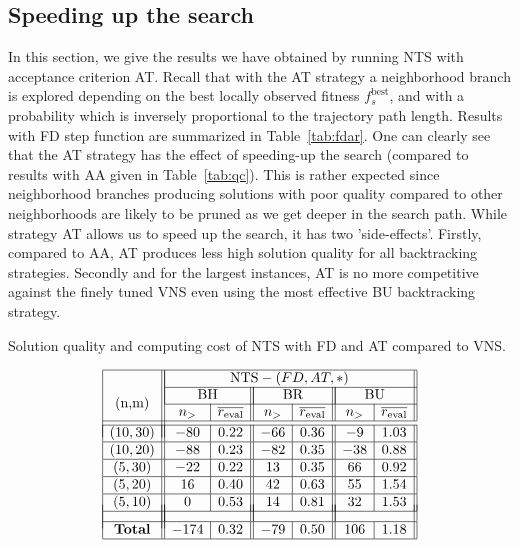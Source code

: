 \documentclass{acm_proc_article-sp}
\begin{document}
\subsection{Speeding up the search}
In this section, we give the results we have obtained by running NTS with acceptance criterion AT. Recall that with the AT strategy a neighborhood branch is explored depending on the best locally observed fitness $f_s^{\textrm{best}}$,  and with a probability which is inversely proportional to the trajectory path length. Results with FD step function are summarized in Table~\ref{tab:fdar}. One can clearly see that the AT strategy has the effect of speeding-up the search (compared to results with AA given in Table~\ref{tab:qc}). This is rather expected since neighborhood branches producing solutions with poor quality compared to other neighborhoods are likely to be pruned as we get deeper in the search path. While strategy AT allows us to speed up the search, it has two 'side-effects'. Firstly, compared to AA, AT produces less high solution quality for all backtracking strategies. Secondly and for the largest instances, AT is no more competitive against the finely tuned VNS even using the most effective BU backtracking strategy.
\vspace{-3ex}
\begin{table}[htb!]
\caption{Solution quality and computing cost of NTS with FD and AT compared to VNS.}
\label{tab:fdar}
\vspace{-3ex}
$$
\begin{array}{|c||c|c||c|c||c|c||}
\hline
\multirow{4}{*}{(n,m)} &\multicolumn{6}{|c||}{\textrm{NTS}-(FD,AT,*)} \\
\cline{2-7}
& \multicolumn{2}{|c||}{\textrm{BH}} & \multicolumn{2}{|c||}{\textrm{BR}} & \multicolumn{2}{|c||}{\textrm{BU}} \\ \cline{2-7}


 & n_{>} & \overline{r_{\textrm{eval}}} & n_{>} & \overline{r_{\textrm{eval}}}  & n_{>} & \overline{r_{\textrm{eval}}} \\ 
 \cline{1-7}
 \\[-9 pt] 
\cline{1-7}

(10,30) & -80 & 0.22 & -66 & 0.36 & -9 & 1.03 \\ \hline
(10,20) & -88 & 0.23 & -82 & 0.35 & -38 & 0.88 \\ \hline
(5,30) & -22 & 0.22 & 13 & 0.35 & 66 & 0.92 \\ \hline
(5,20) & 16 & 0.40 & 42 & 0.63 & 55 & 1.54 \\ \hline
(5,10) & 0 & 0.53 & 14 & 0.81 & 32 & 1.53 \\ \hline\\[-17 pt]
& \multicolumn{2}{|c||}{ } & \multicolumn{2}{|c||}{ } & \multicolumn{2}{|c||}{ } \\ \hline
\textrm{\textbf{Total}} & -174 & 0.32 & -79 & 0.50 & 106 & 1.18 \\ \hline
\end{array}
$$
\end{table}
\end{document}
